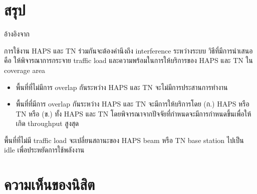 \section{สรุป}

อ้างอิงจาก \cite[Interference Coordination Method for Integrated HAPS-Terrestrial Networks]{liu2021interference}

การใช้งาน HAPS และ TN ร่วมกันจะต้องคำนึงถึง interference ระหว่างระบบ
วิธีที่มีการนำเสนอคือ ให้พิจารณาการกระจาย traffic load และความพร้อมในการให้บริการของ
HAPS และ TN ใน coverage area

\begin{itemize}
    \item พื้นที่ที่ไม่มีการ overlap กันระหว่าง HAPS และ TN จะไม่มีการประสานการทำงาน
    \item พื้นที่ที่มีการ overlap กันระหว่าง HAPS และ TN จะมีการให้บริการโดย (ก.) HAPS หรือ TN หรือ (ข.) ทั้ง HAPS และ TN
            โดยพิจารณาจากปัจจัยที่กำหนดจะมีการกำหนดขึ้นเพื่อให้เกิด throughput สูงสุด
\end{itemize}

พื้นที่ที่ไม่มี traffic load จะเปลี่ยนสถานะของ HAPS beam หรือ TN base station ไปเป็น idle เพื่อประหยัดการใช้พลังงาน

\section{ความเห็นของนิสิต}


